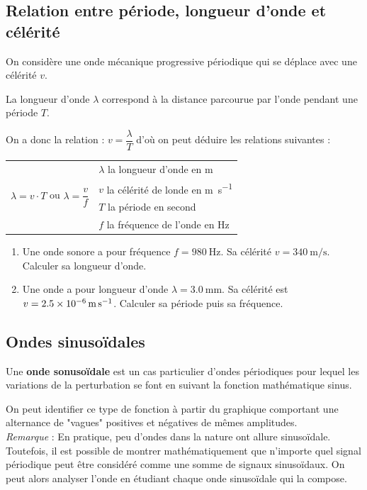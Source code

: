 \documentclass[a4paper,11pt,fleqn]{scrartcl}%
\begin{document}
\subsection{Relation entre période, longueur d'onde et célérité}
On considère une onde mécanique progressive périodique qui se déplace avec une célérité $v$.
\begin{cours}
    La longueur d'onde $\lambda$ correspond à la distance parcourue par l'onde pendant une période $T$.
\end{cours}
On a donc la relation : $v = \dfrac{\lambda}{T}$ d'où on peut déduire les relations suivantes :
\begin{center}
    \begin{tabular}{c|l}
        \multirow{4}{*}{$\lambda = v\cdot T$ \hspace{2em} ou \hspace{2em} $\lambda = \dfrac{v}{f}$} & $\lambda$ la longueur d'onde en \unit{m}\\
        & $v$ la célérité de londe en \unit{\meter\per\second}\\
        & $T$ la période en \unit{second}\\
        & $f$ la fréquence de l'onde en \unit{\hertz}\\
    \end{tabular}
\end{center}

\begin{exemple}
\begin{enumerate}
    \item Une onde sonore a pour fréquence $f = \SI{980}{\hertz}$. Sa célérité $v = \SI{340}{\meter\per\second}$. Calculer sa longueur d'onde.
    \item Une onde a pour longueur d'onde $\lambda = \SI{3,0}{\milli\meter}$. Sa célérité est $v =\SI{2,5E-6}{\meter\per\second}$. Calculer sa période puis sa fréquence.
\end{enumerate}
\end{exemple}

\subsection{Ondes sinusoïdales}
\begin{cours}
    Une \textbf{onde sonusoïdale} est un cas particulier d'ondes périodiques pour lequel les variations de la perturbation se font en suivant la fonction mathématique sinus.
\end{cours}
On peut identifier ce type de fonction à partir du graphique comportant une alternance de "vagues" positives et négatives de mêmes amplitudes.\\
\textit{Remarque} : En pratique, peu d'ondes dans la nature ont allure sinusoïdale. Toutefois, il est possible de montrer mathématiquement que n'importe quel signal périodique peut être considéré comme une somme de signaux sinusoïdaux.
On peut alors analyser l'onde en étudiant chaque onde sinusoïdale qui la compose.\\
\end{document}
